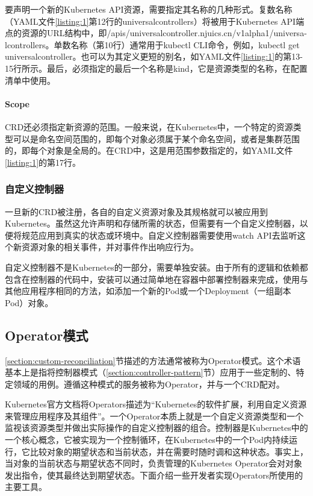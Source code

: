 \documentclass[macfonts,master]{njuthesis}
\begin{document}
要声明一个新的Kubernetes API资源，需要指定其名称的几种形式。复数名称（YAML文件\ref{listing:1}第12行的universalcontrollers）将被用于Kubernetes API端点的资源的URL结构中，即/apis/universalcontroller.njuics.cn/v1alpha1/universa-lcontrollers。单数名称（第10行）通常用于kubectl CLI命令，例如，kubectl get universalcontroller。也可以为其定义更短的别名，如YAML文件\ref{listing:1}的第13-15行所示。最后，必须指定的最后一个名称是kind，它是资源类型的名称，在配置清单中使用。

\paragraph{Scope}

CRD还必须指定新资源的范围。一般来说，在Kubernetes中，一个特定的资源类型可以是命名空间范围的，即每个对象必须属于某个命名空间，或者是集群范围的，即每个对象是全局的。在CRD中，这是用范围参数指定的，如YAML文件\ref{listing:1}的第17行。

\subsubsection{自定义控制器}

一旦新的CRD被注册，各自的自定义资源对象及其规格就可以被应用到Kubernetes。虽然这允许声明和存储所需的状态，但需要有一个自定义控制器，以便将规范应用到真实的状态或环境中。自定义控制器需要使用watch API去监听这个新资源对象的相关事件，并对事件作出响应行为。

自定义控制器不是Kubernetes的一部分，需要单独安装。由于所有的逻辑和依赖都包含在控制器的代码中，安装可以通过简单地在容器中部署控制器来完成，使用与其他应用程序相同的方法，如添加一个新的Pod或一个Deployment（一组副本Pod）对象。

\subsection{Operator模式}

\ref{section:custom-reconciliation}节描述的方法通常被称为Operator模式。这个术语基本上是指将控制器模式（\ref{section:controller-pattern}节）应用于一些定制的、特定领域的用例。遵循这种模式的服务被称为Operator，并与一个CRD配对。

Kubernetes官方文档将Operators描述为``Kubernetes的软件扩展，利用自定义资源来管理应用程序及其组件''\cite{k8soperator}。一个Operator本质上就是一个自定义资源类型和一个监视该资源类型并做出实际操作的自定义控制器的组合。控制器是Kubernetes中的一个核心概念，它被实现为一个控制循环，在Kubernetes中的一个Pod内持续运行，它比较对象的期望状态和当前状态，并在需要时随时调和这种状态。事实上，当对象的当前状态与期望状态不同时，负责管理的Kubernetes Operator会对对象发出指令，使其最终达到期望状态。下面介绍一些开发者实现Operators所使用的主要工具。
\end{document}
